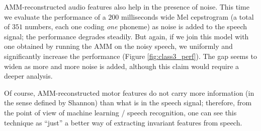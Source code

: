 AMM-reconstructed audio features also help in the presence of noise. This time
we evaluate the performance of a $200$ milliseconds wide Mel cepstrogram (a total
of $351$ numbers, each one coding \emph{one} phoneme) as noise is added to the
speech signal; the performance degrades steadily. But again, if we join this
model with one obtained by running the AMM on the noisy speech, we uniformly
and significantly increase the performance (Figure \ref{fig:class3_perf}). The
gap seems to widen as more and more noise is added, although this claim would
require a deeper analysis.

Of course, AMM-reconstructed motor features do not carry more information
(in the sense defined by Shannon) than what is in the speech signal; therefore,
from the point of view of machine learning / speech recognition, one can see
this technique as ``just'' a better way of extracting invariant features from
speech.
